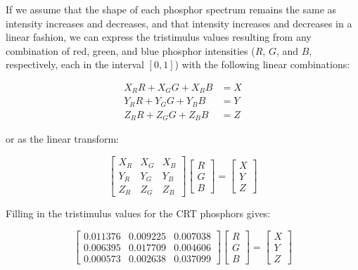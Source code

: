 \documentclass{article}
\begin{document}
\begin{multicols}{2}
If we assume that the shape of each phosphor spectrum remains the same as intensity increases and decreases, and that intensity increases and decreases in a linear fashion, we can express the tristimulus values resulting from any combination of red, green, and blue phosphor intensities ($R$, $G$, and $B$, respectively, each in the interval $[0,1]$) with the following linear combinations:

\begin{equation} %
    \begin{aligned}
        X_RR+X_GG+X_BB&=X\\
        Y_RR+Y_GG+Y_BB&=Y\\
        Z_RR+Z_GG+Z_BB&=Z
    \end{aligned}
\end{equation}

or as the linear transform:

\begin{equation} %
    \begin{bmatrix}
        X_R&X_G&X_B\\
        Y_R&Y_G&Y_B\\
        Z_R&Z_G&Z_B
    \end{bmatrix}\begin{bmatrix}
        R\\
        G\\
        B
    \end{bmatrix}=\begin{bmatrix}
        X\\
        Y\\
        Z
    \end{bmatrix}
\end{equation}

Filling in the tristimulus values for the CRT phosphors gives:

\begin{equation}\label{eq:crt_transformation} %
    \begin{bmatrix}
        0.011376&0.009225&0.007038\\
        0.006395&0.017709&0.004606\\
        0.000573&0.002638&0.037099
    \end{bmatrix}\begin{bmatrix}
        R\\
        G\\
        B
    \end{bmatrix}=\begin{bmatrix}
        X\\
        Y\\
        Z
    \end{bmatrix}
\end{equation}


\end{multicols}
\end{document}
